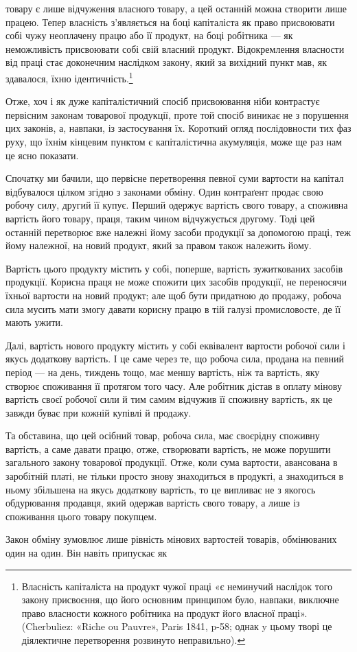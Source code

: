 товару є лише відчуження власного товару, а цей останній можна
створити лише працею. Тепер власність з’являється на боці
капіталіста як право присвоювати собі чужу неоплачену працю
або її продукт, на боці робітника — як неможливість присвоювати
собі свій власний продукт. Відокремлення власности від
праці стає доконечним наслідком закону, який за вихідний пункт
мав, як здавалося, їхню ідентичність.\footnote{
Власність капіталіста на продукт чужої праці «є неминучий
наслідок того закону присвоєння, що його основним принципом було,
навпаки, виключне право власности кожного робітника на продукт його
власної праці». (Cherbuliez: «Riche ou Pauvre», Paris 1841, p-58; однак
y цьому творі це діялектичне перетворення розвинуто неправильно).
}

Отже, хоч і як дуже капіталістичний спосіб присвоювання
ніби контрастує первісним законам товарової продукції, проте
той спосіб виникає не з порушення цих законів, а, навпаки, із застосування
їх. Короткий огляд послідовности тих фаз руху, що
їхнім кінцевим пунктом є капіталістична акумуляція, може ще
раз нам це ясно показати.

Спочатку ми бачили, що первісне перетворення певної суми
вартости на капітал відбувалося цілком згідно з законами обміну.
Один контраґент продає свою робочу силу, другий її купує.
Перший одержує вартість свого товару, а споживна вартість
його товару, праця, таким чином відчужується другому. Тоді
цей останній перетворює вже належні йому засоби продукції
за допомогою праці, теж йому належної, на новий продукт, який
за правом також належить йому.

Вартість цього продукту містить у собі, поперше, вартість
зужиткованих засобів продукції. Корисна праця не може спожити
цих засобів продукції, не переносячи їхньої вартости на
новий продукт; але щоб бути придатною до продажу, робоча
сила мусить мати змогу давати корисну працю в тій галузі промисловосте,
де її мають ужити.

Далі, вартість нового продукту містить у собі еквівалент
вартости робочої сили і якусь додаткову вартість. І це саме через
те, що робоча сила, продана на певний період — на день, тиждень
тощо, має меншу вартість, ніж та вартість, яку створює споживання
її протягом того часу. Але робітник дістав в оплату мінову
вартість своєї робочої сили й тим самим відчужив її споживну
вартість, як це завжди буває при кожній купівлі й продажу.

Та обставина, що цей осібний товар, робоча сила, має своєрідну
споживну вартість, а саме давати працю, отже, створювати
вартість, не може порушити загального закону товарової продукції.
Отже, коли сума вартости, авансована в заробітній платі, не
тільки просто знову знаходиться в продукті, а знаходиться в
ньому збільшена на якусь додаткову вартість, то це випливає
не з якогось обдурювання продавця, який одержав вартість
свого товару, а лише із споживання цього товару покупцем.

Закон обміну зумовлює лише рівність мінових вартостей
товарів, обмінюваних один на один. Він навіть припускає як